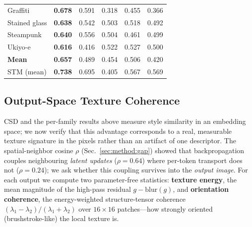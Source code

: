\begin{table}[t]
\begin{tabular}{l ccccc}
  Graffiti         & \cellcolor{tabshade!46}\textbf{0.678} & \cellcolor{tabshade!38}0.591 & \cellcolor{tabshade!14}0.318 & \cellcolor{tabshade!26}0.455 & \cellcolor{tabshade!19}0.366 \\
  Stained glass    & \cellcolor{tabshade!43}\textbf{0.638} & \cellcolor{tabshade!34}0.542 & \cellcolor{tabshade!31}0.503 & \cellcolor{tabshade!32}0.518 & \cellcolor{tabshade!30}0.492 \\
  Steampunk        & \cellcolor{tabshade!43}\textbf{0.640} & \cellcolor{tabshade!35}0.556 & \cellcolor{tabshade!31}0.504 & \cellcolor{tabshade!27}0.461 & \cellcolor{tabshade!30}0.499 \\
  Ukiyo-e          & \cellcolor{tabshade!41}\textbf{0.616} & \cellcolor{tabshade!23}0.416 & \cellcolor{tabshade!32}0.522 & \cellcolor{tabshade!33}0.527 & \cellcolor{tabshade!30}0.500 \\
  \midrule
  \textbf{Mean}    & \cellcolor{tabshade!44}\textbf{0.657} & \cellcolor{tabshade!29}0.489 & \cellcolor{tabshade!26}0.454 & \cellcolor{tabshade!31}0.506 & \cellcolor{tabshade!23}0.420 \\
  \midrule
  STM (mean)       & \textbf{0.738} & 0.695 & 0.405 & 0.567 & 0.569 \\
  \bottomrule
  \end{tabular}
\end{table}

\subsection{Output-Space Texture Coherence}
\label{sec:exp:texcoh}

CSD and the per-family results above measure style similarity in an embedding
space; we now verify that this advantage corresponds to a real, measurable
texture signature in the pixels rather than an artifact of one descriptor.
The spatial-neighbor cosine $\rho$ (Sec.~\ref{sec:method:gap}) showed that
backpropagation couples neighbouring \emph{latent updates} ($\rho{=}0.64$) where
per-token transport does not ($\rho{=}0.24$); we ask whether this coupling
survives into the \emph{output image}. For each output we compute two
parameter-free statistics: \textbf{texture energy}, the mean magnitude of the
high-pass residual $g-\mathrm{blur}(g)$, and \textbf{orientation coherence}, the
energy-weighted structure-tensor coherence
$(\lambda_1{-}\lambda_2)/(\lambda_1{+}\lambda_2)$ over $16\times16$ patches---how
strongly oriented (brushstroke-like) the local texture is.

